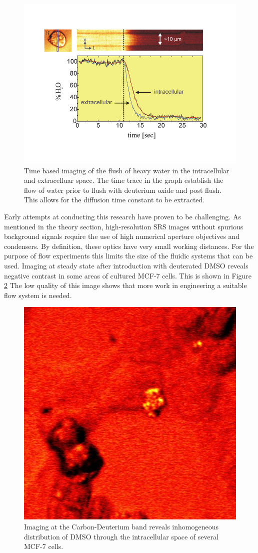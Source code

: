    \begin{figure}[h]
       \centering
       \includegraphics[width=\textwidth]{Figures/flow.png}
       \caption{Time based imaging of the flush of heavy water in the intracellular and extracelluar space. The time trace in the graph establish the flow of water prior to flush with deuterium oxide and post flush.  This allows for the diffusion time constant to be extracted.}
       \label{fig:flow}
   \end{figure}
   
   Early attempts at conducting this research have proven to be challenging.  As mentioned in the theory section, high-resolution SRS images without spurious background signals require the use of high numerical aperture objectives and condensers.  By definition, these optics have very small working distances.  For the purpose of flow experiments this limits the size of the fluidic systems that can be used. Imaging at steady state after introduction with deuterated DMSO reveals negative contrast in some areas of cultured MCF-7 cells.  This is shown in Figure \ref{fig:MCF7}  The low quality of this image shows that more work in engineering a suitable flow system is needed.
   
   
 \begin{figure}[h]
     \centering
     \includegraphics[width=.5\textwidth]{Figures/3DMSO.jpg}
     \caption{Imaging at the Carbon-Deuterium band reveals inhomogeneous distribution of DMSO through the intracellular space of several MCF-7 cells.}
     \label{fig:MCF7}
 \end{figure}

